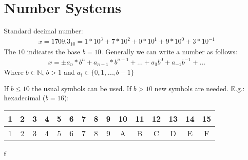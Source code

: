 \chapter{Number Systems}\label{ch:number-systems}
Standard decimal number:
\begin{align*}
    x = 1709.3_{10} = 1 * 10^{3} + 7 * 10^2 + 0*10^1+9*10^0+3*10^{-1}
\end{align*}
The $10$ indicates the base $b=10$.
Generally we can write a number as follows:
\begin{align*}
    x =\pm a_n*b^n+a_{n-1}*b^{n-1}+\ldots+a_0 b^0+a_{-1}b^{-1}+\ldots
\end{align*}
Where $b \in \mathbb{N}$, $b>1$ and $a_i \in \{0,1, \dots, b-1\}$

If $b \leq 10$ the usual symbols can be used.
If $b>10$ new symbols are needed.
E.g.: hexadecimal ($b=16$):

\begin{center}
    \begin{tabular}{ c | c| c |c| c| c| c| c| c| c| c| c| c| c| c}
        1 & 2 & 3 & 4 & 5 & 6 & 7 & 8 & 9 & 10 & 11 & 12 & 13 & 14 & 15 \\
        \hline
        1 & 2 & 3 & 4 & 5 & 6 & 7 & 8 & 9 & A  & B  & C  & D  & E  & F  \\
    \end{tabular}
\end{center}f


